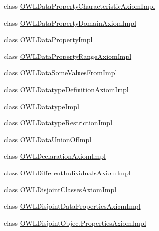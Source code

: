 \begin{DoxyCompactItemize}
\item 
class \hyperlink{classuk_1_1ac_1_1manchester_1_1cs_1_1owl_1_1owlapi_1_1_o_w_l_data_property_characteristic_axiom_impl}{O\-W\-L\-Data\-Property\-Characteristic\-Axiom\-Impl}
\item 
class \hyperlink{classuk_1_1ac_1_1manchester_1_1cs_1_1owl_1_1owlapi_1_1_o_w_l_data_property_domain_axiom_impl}{O\-W\-L\-Data\-Property\-Domain\-Axiom\-Impl}
\item 
class \hyperlink{classuk_1_1ac_1_1manchester_1_1cs_1_1owl_1_1owlapi_1_1_o_w_l_data_property_impl}{O\-W\-L\-Data\-Property\-Impl}
\item 
class \hyperlink{classuk_1_1ac_1_1manchester_1_1cs_1_1owl_1_1owlapi_1_1_o_w_l_data_property_range_axiom_impl}{O\-W\-L\-Data\-Property\-Range\-Axiom\-Impl}
\item 
class \hyperlink{classuk_1_1ac_1_1manchester_1_1cs_1_1owl_1_1owlapi_1_1_o_w_l_data_some_values_from_impl}{O\-W\-L\-Data\-Some\-Values\-From\-Impl}
\item 
class \hyperlink{classuk_1_1ac_1_1manchester_1_1cs_1_1owl_1_1owlapi_1_1_o_w_l_datatype_definition_axiom_impl}{O\-W\-L\-Datatype\-Definition\-Axiom\-Impl}
\item 
class \hyperlink{classuk_1_1ac_1_1manchester_1_1cs_1_1owl_1_1owlapi_1_1_o_w_l_datatype_impl}{O\-W\-L\-Datatype\-Impl}
\item 
class \hyperlink{classuk_1_1ac_1_1manchester_1_1cs_1_1owl_1_1owlapi_1_1_o_w_l_datatype_restriction_impl}{O\-W\-L\-Datatype\-Restriction\-Impl}
\item 
class \hyperlink{classuk_1_1ac_1_1manchester_1_1cs_1_1owl_1_1owlapi_1_1_o_w_l_data_union_of_impl}{O\-W\-L\-Data\-Union\-Of\-Impl}
\item 
class \hyperlink{classuk_1_1ac_1_1manchester_1_1cs_1_1owl_1_1owlapi_1_1_o_w_l_declaration_axiom_impl}{O\-W\-L\-Declaration\-Axiom\-Impl}
\item 
class \hyperlink{classuk_1_1ac_1_1manchester_1_1cs_1_1owl_1_1owlapi_1_1_o_w_l_different_individuals_axiom_impl}{O\-W\-L\-Different\-Individuals\-Axiom\-Impl}
\item 
class \hyperlink{classuk_1_1ac_1_1manchester_1_1cs_1_1owl_1_1owlapi_1_1_o_w_l_disjoint_classes_axiom_impl}{O\-W\-L\-Disjoint\-Classes\-Axiom\-Impl}
\item 
class \hyperlink{classuk_1_1ac_1_1manchester_1_1cs_1_1owl_1_1owlapi_1_1_o_w_l_disjoint_data_properties_axiom_impl}{O\-W\-L\-Disjoint\-Data\-Properties\-Axiom\-Impl}
\item 
class \hyperlink{classuk_1_1ac_1_1manchester_1_1cs_1_1owl_1_1owlapi_1_1_o_w_l_disjoint_object_properties_axiom_impl}{O\-W\-L\-Disjoint\-Object\-Properties\-Axiom\-Impl}

\end{DoxyCompactItemize}
